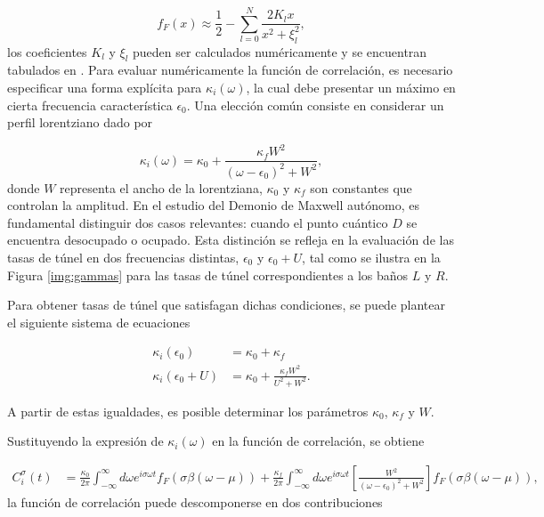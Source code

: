 \begin{appendixs}
\begin{equation}
    f_{F}(x) \approx \frac{1}{2} - \sum_{l=0}^{N} \frac{ 2 K_{l}x }{ x^{2} + \xi^{2}_{l} },
    \label{apendix5:pade}
\end{equation}
los coeficientes $K_{l}$ y $\xi_{l}$ pueden ser calculados numéricamente y se encuentran tabulados en \cite{hu2011pade}. Para evaluar numéricamente la función de correlación, es necesario especificar una forma explícita para $\kappa_{i}(\omega)$, la cual debe presentar un máximo en cierta frecuencia característica $\epsilon_{0}$. Una elección común consiste en considerar un perfil lorentziano dado por

\begin{equation*}
    \kappa_{i}(\omega) = \kappa_{0} + \frac{\kappa_{f} W^{2}}{(\omega - \epsilon_{0})^{2} + W^{2}},
\end{equation*}
donde $W$ representa el ancho de la lorentziana, $\kappa_{0}$ y $\kappa_{f}$ son constantes que controlan la amplitud. En el estudio del Demonio de Maxwell autónomo, es fundamental distinguir dos casos relevantes: cuando el punto cuántico $D$ se encuentra desocupado o ocupado. Esta distinción se refleja en la evaluación de las tasas de túnel en dos frecuencias distintas, $\epsilon_{0}$ y $\epsilon_{0} + U$, tal como se ilustra en la Figura \ref{img:gammas} para las tasas de túnel correspondientes a los baños $L$ y $R$.


Para obtener tasas de túnel que satisfagan dichas condiciones, se puede plantear el siguiente sistema de ecuaciones 

\begin{align*}
    \kappa_{i}(\epsilon_{0}) & = \kappa_{0} + \kappa_{f} \\
    \kappa_{i}(\epsilon_{0} + U) & = \kappa_{0} + \frac{\kappa_{f} W^{2} }{U^{2} + W^{2}}.
\end{align*}

A partir de estas igualdades, es posible determinar los parámetros $\kappa_{0}$, $\kappa_{f}$ y $W$. 

Sustituyendo la expresión de $\kappa_{i}(\omega)$ en la función de correlación, se obtiene

\begin{align*}
    C^{\sigma}_{i}(t) & = \frac{\kappa_{0}}{2\pi} \int_{-\infty}^{\infty}d\omega e^{i\sigma \omega t} f_{F}(\sigma \beta (\omega-\mu)) + \frac{\kappa_{f}}{2\pi} \int_{-\infty}^{\infty}d\omega e^{i\sigma \omega t}\left[ \frac{W^{2}}{(\omega-\epsilon_{0})^{2} + W^{2}} \right] f_{F}(\sigma \beta (\omega-\mu)),
\end{align*}
la función de correlación puede descomponerse en dos contribuciones


\end{appendixs}
